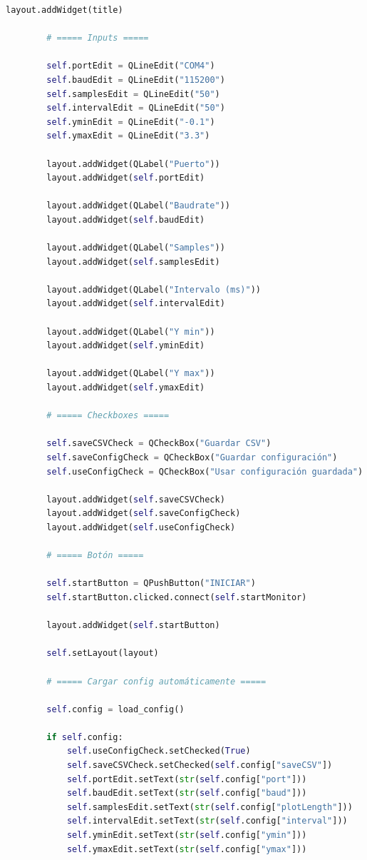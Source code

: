 \documentclass[12pt,letterpaper,twoside]{article}
\begin{document}
\begin{lstlisting}[language=Python]
        layout.addWidget(title)

        # ===== Inputs =====

        self.portEdit = QLineEdit("COM4")
        self.baudEdit = QLineEdit("115200")
        self.samplesEdit = QLineEdit("50")
        self.intervalEdit = QLineEdit("50")
        self.yminEdit = QLineEdit("-0.1")
        self.ymaxEdit = QLineEdit("3.3")

        layout.addWidget(QLabel("Puerto"))
        layout.addWidget(self.portEdit)

        layout.addWidget(QLabel("Baudrate"))
        layout.addWidget(self.baudEdit)

        layout.addWidget(QLabel("Samples"))
        layout.addWidget(self.samplesEdit)

        layout.addWidget(QLabel("Intervalo (ms)"))
        layout.addWidget(self.intervalEdit)

        layout.addWidget(QLabel("Y min"))
        layout.addWidget(self.yminEdit)

        layout.addWidget(QLabel("Y max"))
        layout.addWidget(self.ymaxEdit)

        # ===== Checkboxes =====

        self.saveCSVCheck = QCheckBox("Guardar CSV")
        self.saveConfigCheck = QCheckBox("Guardar configuración")
        self.useConfigCheck = QCheckBox("Usar configuración guardada")

        layout.addWidget(self.saveCSVCheck)
        layout.addWidget(self.saveConfigCheck)
        layout.addWidget(self.useConfigCheck)

        # ===== Botón =====

        self.startButton = QPushButton("INICIAR")
        self.startButton.clicked.connect(self.startMonitor)

        layout.addWidget(self.startButton)

        self.setLayout(layout)

        # ===== Cargar config automáticamente =====

        self.config = load_config()

        if self.config:
            self.useConfigCheck.setChecked(True)
            self.saveCSVCheck.setChecked(self.config["saveCSV"])
            self.portEdit.setText(str(self.config["port"]))
            self.baudEdit.setText(str(self.config["baud"]))
            self.samplesEdit.setText(str(self.config["plotLength"]))
            self.intervalEdit.setText(str(self.config["interval"]))
            self.yminEdit.setText(str(self.config["ymin"]))
            self.ymaxEdit.setText(str(self.config["ymax"]))


\end{lstlisting}
\end{document}
